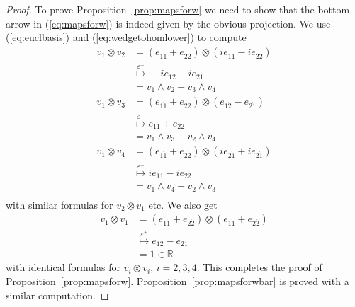 \documentclass[twoside]{amsart}
\newcommand{\RR}{\ensuremath{\mathbb{R}}}
\renewcommand{\eqref}[1]{(\ref{eq:#1})}
\newcommand{\propref}[1]{Proposition~\ref{prop:#1}}
\renewcommand{\epsilon}{\varepsilon}
\newcommand{\enm}[1]{\ensuremath{#1}}
\newcommand{\eps}{\enm{\epsilon}}
\renewcommand{\epsilon}{\varepsilon}
\newcommand{\bothlowerabc}[3]{\enm{{#1}_{#2 #3}}}
\newcommand{\dotbothlowerabc}[3]{\bothlowerabc{#1}{#2}{\dot{#3}}}
\renewcommand{\ell}[2]{\bothlowerabc{e}{#1}{#2}}
\newcommand{\eldl}[2]{\dotbothlowerabc{e}{#1}{#2}}
\begin{document}
\begin{proof} To prove \propref{mapsforw} we need to show that the bottom arrow
in \eqref{mapsforw} is indeed given by
the obvious projection.
We use \eqref{euclbasis} and \eqref{wedgetohomlower} to compute
\begin{align*}
    v_{1}\otimes v_{2} &= ( \eldl{1}{1} +  \eldl{2}{2})
                \otimes (i\eldl{1}{1} - i\eldl{2}{2}) \\
                &\stackrel{\eps^{+}}{\mapsto}
                -i\ell{1}{2} - i\ell{2}{1} \\
                &= v_{1}\wedge v_{2} + v_{3}\wedge v_{4} \\
    v_{1}\otimes v_{3} &= ( \eldl{1}{1} +  \eldl{2}{2})
                \otimes (\eldl{1}{2} - \eldl{2}{1}) \\
                &\stackrel{\eps^{+}}{\mapsto}
                \ell{1}{1} + \ell{2}{2} \\
                &= v_{1}\wedge v_{3} - v_{2}\wedge v_{4} \\
    v_{1}\otimes v_{4} &= ( \eldl{1}{1} +  \eldl{2}{2})
                \otimes (i\eldl{2}{1} + i\eldl{2}{1}) \\
                &\stackrel{\eps^{+}}{\mapsto}
                i\ell{1}{1} - i\ell{2}{2} \\
                &= v_{1}\wedge v_{4} + v_{2}\wedge v_{3} \\
\end{align*}
with similar formulas for \( v_{2}\otimes v_{1} \) etc.  We also get
\begin{align*}
    v_{1}\otimes v_{1} &= ( \eldl{1}{1} +  \eldl{2}{2})
        \otimes (\eldl{1}{1} + \eldl{2}{2}) \\
        &\stackrel{\eps^{+}}{\mapsto} \ell{1}{2} - \ell{2}{1} \\
        &= 1 \in\RR
\end{align*}
with identical formulas for \( v_{i}\otimes v_{i} \), \( i=2, 3, 4.
\) This completes the proof of \propref{mapsforw}.
\propref{mapsforwbar} is proved with a similar computation.
\end{proof}
\end{document}
